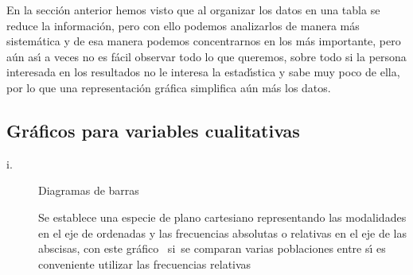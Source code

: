 En la secci\'{o}n anterior hemos visto que al organizar los datos en una tabla
se reduce la informaci\'{o}n, pero con ello podemos analizarlos de manera
m\'{a}s sistem\'{a}tica y de esa manera podemos concentrarnos en los m\'{a}s
importante, pero a\'{u}n as\'{\i} a veces no es f\'{a}cil observar todo lo que
queremos, sobre todo si la persona interesada en los resultados no le interesa
la estad\'{\i}stica y sabe muy poco de ella, por lo que una representaci\'{o}n
gr\'{a}fica simplifica a\'{u}n m\'{a}s los datos.

\subsection{Gr\'{a}ficos para variables cualitativas}

\begin{description}
\item[i.] Diagramas de barras

Se establece una especie de plano cartesiano representando las modalidades en
el eje de ordenadas y las frecuencias absolutas o relativas en el eje de las
abscisas, con este gr\'{a}fico \ si\ se comparan varias poblaciones entre
s\'{\i} es conveniente utilizar las frecuencias relativas
\end{description}

